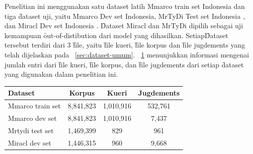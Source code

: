 Penelitian ini menggunakan satu \f{dataset} latih Mmarco train set Indonesia \citep{mmarco} dan tiga \f{dataset} uji, yaitu Mmarco Dev set Indonesia, MrTyDi Test set Indonesia \citep{mrtydi}, dan Miracl Dev set Indonesia \citep{miracl}. \f{Dataset} Miracl dan MrTyDi dipilih sebagai uji kemampuan \f{out-of-distibution} dari model yang dihasilkan. Setiap\f{Dataset} tersebut terdiri dari 3 \f{file}, yaitu \f{file} kueri, \f{file} korpus dan \f{file jugdements} yang telah dijelaskan pada \sect~\ref{sec:dataset-umum}. \tab~\ref{tab:dataset-info} menunjukkan informasi mengenai jumlah entri dari \f{file} kueri, \f{file korpus}, dan \f{file jugdements} dari setiap \f{dataset} yang digunakan dalam penelitian ini.
\begin{table}
    \centering
    \label{tab:dataset-info}
    \begin{tabular}{|l|c|c|c|} \hline
        \textbf{Dataset} & \textbf{Korpus} & \textbf{Kueri} & \textbf{Jugdements} \\ \hline
        Mmarco train set & 8,841,823       & 1,010,916      & 532,761             \\ \hline
        Mmarco dev set   & 8,841,823       & 1,010,916      & 7,437               \\ \hline
        Mrtydi test set  & 1,469,399       & 829            & 961                 \\ \hline
        Miracl dev set   & 1,446,315       & 960            & 9,668               \\ \hline
    \end{tabular}
\end{table}


